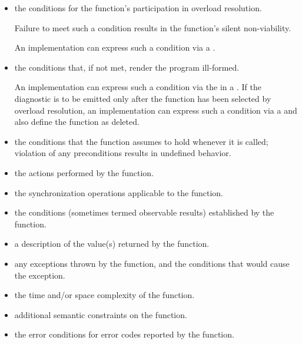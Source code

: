 \begin{itemize}
\item
\constraints
the conditions for the function's participation
in overload resolution.
\begin{note}
Failure to meet such a condition results in the function's silent non-viability.
\end{note}
\begin{example}
An implementation can express such a condition
via a .
\end{example}

\item
\mandates
the conditions that, if not met, render the program ill-formed.
\begin{example}
An implementation can express such a condition
via the 
in a .
If the diagnostic is to be emitted only after the function
has been selected by overload resolution,
an implementation can express such a condition
via a 
and also define the function as deleted.
\end{example}

\item
\expects
the conditions
that the function assumes to hold whenever it is called;
violation of any preconditions results in undefined behavior.

\item
\effects
the actions performed by the function.

\item
\sync
the synchronization operations applicable to the function.

\item
\ensures
the conditions (sometimes termed observable results)
established by the function.

\item
\returns
a description of the value(s) returned by the function.

\item
\throws
any exceptions thrown by the function, and the conditions that would cause the exception.

\item
\complexity
the time and/or space complexity of the function.

\item
\remarks
additional semantic constraints on the function.

\item
\errors
the error conditions for error codes reported by the function.
\end{itemize}

